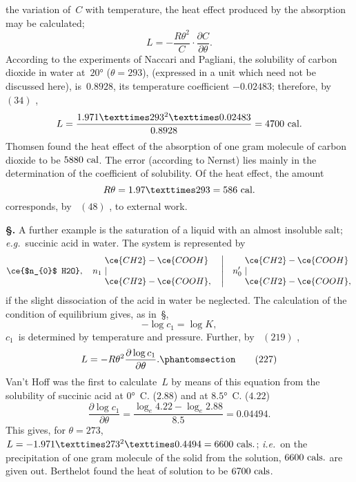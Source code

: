 \documentclass[12pt]{book}[2005/09/16]
\newcommand{\Chg}[2]{#2}
\newcommand{\Add}[1]{\Chg{}{#1}}
\newcommand{\Erratum}[2]{#2}
\newcommand{\Section}[1]{
  \medskip\par\textbf{§\;#1}
  \label{section:#1}
}
\newcommand{\SecRef}[2][§\;]{\hyperref[section:#2.]{{\upshape #1#2}}}
\newcommand{\Tag}[1]{%
  \phantomsection\label{eqn:#1}\tag*{\ensuremath{#1}}%
}
\newcommand{\Eq}[1]{%
  \hyperref[eqn:#1]{\ensuremath{#1}}%
}
\newcommand{\PageSep}[1]{\ignorespaces}
\newcommand{\eg}{\emph{e.g.}}
\newcommand{\ie}{\emph{i.e.}}
\newcommand{\dd}{\partial}
\newcommand{\Unit}[1]{\text{\upshape #1}}
\begin{document}
the variation of~$C$ with temperature, the heat effect produced
by the absorption may be calculated;
\[
L = -\frac{R \theta^{2}}{C} · \frac{\dd C}{\dd \theta}.
\]
According to the experiments of Naccari and Pagliani,
%
%
the solubility of carbon dioxide in water at~$20°$ ($\theta = 293$),
(expressed in a unit which need not be discussed here),
is~$0.8928$, its temperature coefficient $-0.02483$; therefore,
by~\Eq{(34)},
\[
L = \frac{1.971 × 293^{2} × 0.02483}{0.8928} = 4700~\Unit{cal.}
\]
Thomsen found the heat effect of the absorption of one gram
molecule of carbon dioxide to be $5880~\Unit{cal}$. The error
(according to Nernst) lies mainly in the determination of
%
the coefficient of solubility. Of the heat effect, the amount
\[
R\theta = 1.97 × 293 = 586~\Unit{cal.}
\]
corresponds, by~\Eq{(48)}, to external work.

\Section{266.} A further example is the saturation of a liquid
\PageSep{243}
with an almost insoluble salt; \eg\ succinic acid in water.
%
The system is represented by
\[
\ce{$n_{0}$ H2O},\quad
n_{1}\ \begin{array}{@{}l@{}}
\ce{CH2} - \ce{COOH} \\
| \\
\ce{CH2} - \ce{COOH}, \\
\end{array}
\quad\left|\quad
n_{0}'\ \begin{array}{@{}l@{}}
\ce{CH2} - \ce{COOH} \\
| \\
\ce{CH2} - \ce{COOH}, \\
\end{array}
\right.
\]
if the slight dissociation of the acid in water be neglected.
The calculation of the condition of equilibrium gives, as in~\SecRef{223},
\[
-\log c_{1} = \log K,
\]
$c_{1}$~is determined by temperature and pressure. Further, by~\Eq{(219)},
\[
L = -R\theta^{2} \frac{\dd \log c_{1}}{\dd \theta}\Add{.}
\Tag{(227)}
\]
Van't Hoff was the first to calculate~$L$ by means of this
equation from the solubility of succinic acid at $0°$~C. ($2.88$)
and at $8.5°$~C. ($4.22$)
\[
\frac{\dd \log c_{1}}{\dd \theta} = \frac{\log_{e} 4.22 - \log_{e} 2.88}{8.5}
  = 0.04494.
\]
This gives, for $\theta = 273$, $L = -1.971 × 273^{2} × 0.4494
= 6600~\Unit{cals.}$; \ie\ on the precipitation of one \Erratum{molecule}{gram molecule}
of the solid from the solution, $6600~\Unit{cals.}$ are given out.
Berthelot found the heat of solution to be $6700~\Unit{cals}$.
%
\end{document}

